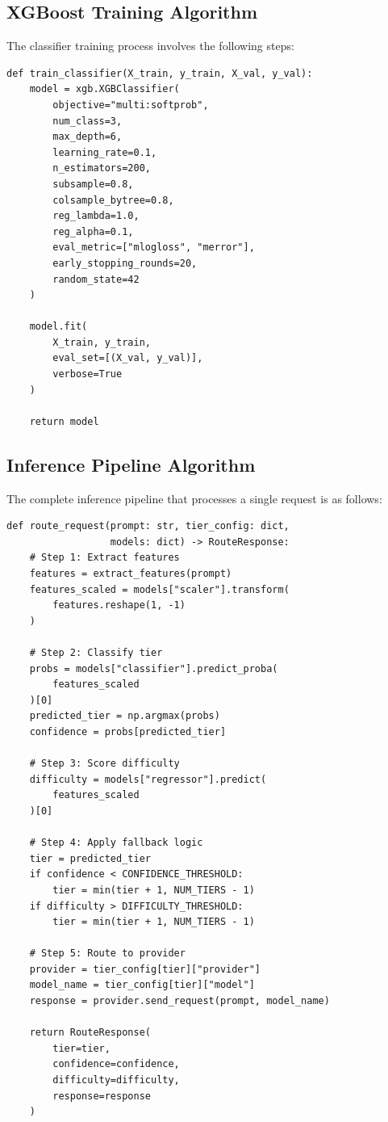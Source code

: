 \documentclass[oneside,12pt,a4paper]{report}
\begin{document}
\subsection{XGBoost Training Algorithm}

The classifier training process involves the following steps:

\begin{lstlisting}[caption=XGBoost Classifier Training]
def train_classifier(X_train, y_train, X_val, y_val):
    model = xgb.XGBClassifier(
        objective="multi:softprob",
        num_class=3,
        max_depth=6,
        learning_rate=0.1,
        n_estimators=200,
        subsample=0.8,
        colsample_bytree=0.8,
        reg_lambda=1.0,
        reg_alpha=0.1,
        eval_metric=["mlogloss", "merror"],
        early_stopping_rounds=20,
        random_state=42
    )
    
    model.fit(
        X_train, y_train,
        eval_set=[(X_val, y_val)],
        verbose=True
    )
    
    return model
\end{lstlisting}

\subsection{Inference Pipeline Algorithm}

The complete inference pipeline that processes a single request is as follows:

\begin{lstlisting}[caption=Request Inference Pipeline]
def route_request(prompt: str, tier_config: dict,
                  models: dict) -> RouteResponse:
    # Step 1: Extract features
    features = extract_features(prompt)
    features_scaled = models["scaler"].transform(
        features.reshape(1, -1)
    )
    
    # Step 2: Classify tier
    probs = models["classifier"].predict_proba(
        features_scaled
    )[0]
    predicted_tier = np.argmax(probs)
    confidence = probs[predicted_tier]
    
    # Step 3: Score difficulty
    difficulty = models["regressor"].predict(
        features_scaled
    )[0]
    
    # Step 4: Apply fallback logic
    tier = predicted_tier
    if confidence < CONFIDENCE_THRESHOLD:
        tier = min(tier + 1, NUM_TIERS - 1)
    if difficulty > DIFFICULTY_THRESHOLD:
        tier = min(tier + 1, NUM_TIERS - 1)
    
    # Step 5: Route to provider
    provider = tier_config[tier]["provider"]
    model_name = tier_config[tier]["model"]
    response = provider.send_request(prompt, model_name)
    
    return RouteResponse(
        tier=tier,
        confidence=confidence,
        difficulty=difficulty,
        response=response
    )
\end{lstlisting}
\end{document}
